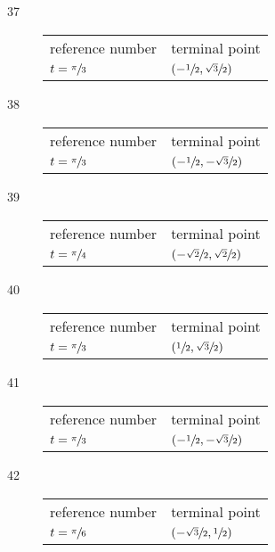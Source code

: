 \documentclass{exam}
\begin{document}
\begin{description}
      \item[37]
        \begin{tabular}[H]{ll}
          \toprule
          reference number    & terminal point \\
          $t = \sfrac{\pi}{3}$ & $\left( - \sfrac{1}{2}, \sfrac{\sqrt{3}}{2} \right)$ \\
          \bottomrule
        \end{tabular}

      \item[38]
        \begin{tabular}[H]{ll}
          \toprule
          reference number    & terminal point \\
          $t = \sfrac{\pi}{3}$ & $\left( - \sfrac{1}{2}, - \sfrac{\sqrt{3}}{2} \right)$ \\
          \bottomrule
        \end{tabular}

      \item[39]
        \begin{tabular}[H]{ll}
          \toprule
          reference number    & terminal point \\
          $t = \sfrac{\pi}{4}$ & $\left( - \sfrac{\sqrt{2}}{2}, \sfrac{\sqrt{2}}{2} \right)$ \\
          \bottomrule
        \end{tabular}

      \item[40]
        \begin{tabular}[H]{ll}
          \toprule
          reference number    & terminal point \\
          $t = \sfrac{\pi}{3}$ & $\left( \sfrac{1}{2}, \sfrac{\sqrt{3}}{2} \right)$ \\
          \bottomrule
        \end{tabular}

      \item[41]
        \begin{tabular}[H]{ll}
          \toprule
          reference number    & terminal point \\
          $t = \sfrac{\pi}{3}$ & $\left( - \sfrac{1}{2}, - \sfrac{\sqrt{3}}{2} \right)$ \\
          \bottomrule
        \end{tabular}

      \item[42]
        \begin{tabular}[H]{ll}
          \toprule
          reference number    & terminal point \\
          $t = \sfrac{\pi}{6}$ & $\left( - \sfrac{\sqrt{3}}{2}, \sfrac{1}{2} \right)$ \\
          \bottomrule
        \end{tabular}


\end{description}
\end{document}
